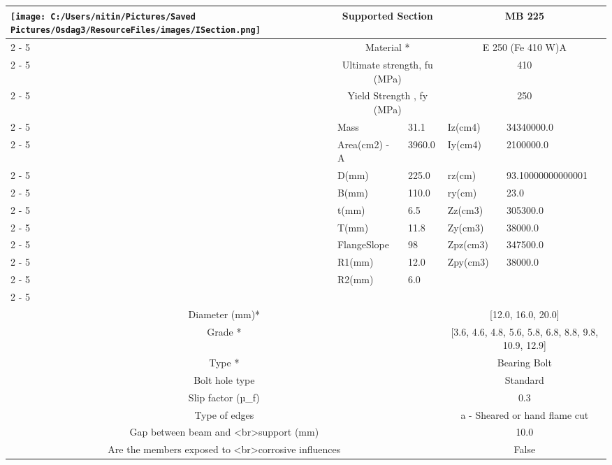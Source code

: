 \documentclass{article}%
\begin{document}
\begin{longtable}{|p{5cm}|p{2cm}|p{2cm}|p{2cm}|p{5cm}|}
\hline%
\hline%
\multirow{13}{*}{\texttt{[image: C:/Users/nitin/Pictures/Saved Pictures/Osdag3/ResourceFiles/images/ISection.png]}}&\multicolumn{2}{|c|}{Supported Section}&\multicolumn{2}{|c|}{MB 225}\\%
\cline{2%
-%
5}%
&\multicolumn{2}{|c|}{Material *}&\multicolumn{2}{|c|}{E 250 (Fe 410 W)A}\\%
\cline{2%
-%
5}%
&\multicolumn{2}{|c|}{Ultimate strength, fu (MPa)}&\multicolumn{2}{|c|}{410}\\%
\cline{2%
-%
5}%
&\multicolumn{2}{|c|}{Yield Strength , fy (MPa)}&\multicolumn{2}{|c|}{250}\\%
\cline{2%
-%
5}%
&Mass&31.1&Iz(cm4)&34340000.0\\%
\cline{2%
-%
5}%
&Area(cm2) {-} A&3960.0&Iy(cm4)&2100000.0\\%
\cline{2%
-%
5}%
&D(mm)&225.0&rz(cm)&93.10000000000001\\%
\cline{2%
-%
5}%
&B(mm)&110.0&ry(cm)&23.0\\%
\cline{2%
-%
5}%
&t(mm)&6.5&Zz(cm3)&305300.0\\%
\cline{2%
-%
5}%
&T(mm)&11.8&Zy(cm3)&38000.0\\%
\cline{2%
-%
5}%
&FlangeSlope&98&Zpz(cm3)&347500.0\\%
\cline{2%
-%
5}%
&R1(mm)&12.0&Zpy(cm3)&38000.0\\%
\cline{2%
-%
5}%
&R2(mm)&6.0&&\\%
\cline{2%
-%
5}%
\hline%
\multicolumn{5}{|c|}{\textbf{Bolt Details}}\\%
\hline%
\hline%
\multicolumn{3}{|c|}{Diameter (mm)*}&\multicolumn{2}{|c|}{{[}12.0, 16.0, 20.0{]}}\\%
\hline%
\hline%
\multicolumn{3}{|c|}{Grade *}&\multicolumn{2}{|c|}{{[}3.6, 4.6, 4.8, 5.6, 5.8, 6.8, 8.8, 9.8, 10.9, 12.9{]}}\\%
\hline%
\hline%
\multicolumn{3}{|c|}{Type *}&\multicolumn{2}{|c|}{Bearing Bolt}\\%
\hline%
\hline%
\multicolumn{3}{|c|}{Bolt hole type}&\multicolumn{2}{|c|}{Standard}\\%
\hline%
\hline%
\multicolumn{3}{|c|}{Slip factor (µ\_f)}&\multicolumn{2}{|c|}{0.3}\\%
\hline%
\hline%
\multicolumn{3}{|c|}{Type of edges}&\multicolumn{2}{|c|}{a {-} Sheared or hand flame cut}\\%
\hline%
\hline%
\multicolumn{3}{|c|}{Gap between beam and <br>support (mm)}&\multicolumn{2}{|c|}{10.0}\\%
\hline%
\hline%
\multicolumn{3}{|c|}{Are the members exposed to <br>corrosive influences}&\multicolumn{2}{|c|}{False}\\%

\end{longtable}
\end{document}
